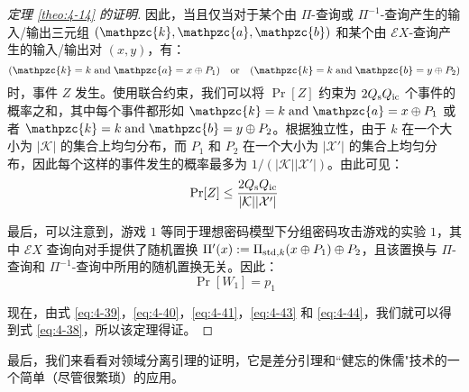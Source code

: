 \begin{proof}[定理 \ref{theo:4-14} 的证明]
因此，当且仅当对于某个由 $\Pi$-查询或 $\Pi^{-1}$-查询产生的输入/输出三元组 $(\mathpzc{k},\mathpzc{a},\mathpzc{b})$ 和某个由 $\mathcal{E}X$-查询产生的输入/输出对 $(x,y)$，有：
\begin{equation}
(\mathpzc{k}=k\;{\rm and}\;\mathpzc{a}=x\oplus P_1)
\quad\text{or}\quad
(\mathpzc{k}=k\;{\rm and}\;\mathpzc{b}=y\oplus P_2)
\end{equation}
时，事件 $Z$ 发生。使用联合约束，我们可以将 $\Pr[Z]$ 约束为 $2Q_{\rm s}Q_{\rm ic}$ 个事件的概率之和，其中每个事件都形如 $\mathpzc{k}=k\;\text{and}\;\mathpzc{a}=x\oplus P_1$ 或者 $\mathpzc{k}=k\;\text{and}\;\mathpzc{b}=y\oplus P_2$。根据独立性，由于 $k$ 在一个大小为 $|\mathcal{K}|$ 的集合上均匀分布，而 $P_1$ 和 $P_2$ 在一个大小为 $|\mathcal{X}'|$ 的集合上均匀分布，因此每个这样的事件发生的概率最多为 ${1}/{(|\mathcal{K}||\mathcal{X}'|)}$。由此可见：
\begin{equation}\label{eq:4-43}
\Pr[Z]\leq\frac{2Q_{\rm s}Q_{\rm ic}}{|\mathcal{K}||\mathcal{X}'|}
\end{equation}

最后，可以注意到，游戏 $1$ 等同于理想密码模型下分组密码攻击游戏的实验 $1$，其中 $\mathcal{E}X$ 查询向对手提供了随机置换 $\Pi'(x):=\Pi_{{\rm std},k}(x\oplus P_1) \oplus P_2$，且该置换与 $\Pi$-查询和 $\Pi^{-1}$-查询中所用的随机置换无关。因此：
\begin{equation}\label{eq:4-44}
\Pr[W_1]=p_1
\end{equation}

现在，由式 \ref{eq:4-39}，\ref{eq:4-40}，\ref{eq:4-41}，\ref{eq:4-43} 和 \ref{eq:4-44}，我们就可以得到式 \ref{eq:4-38}，所以该定理得证。
\end{proof}


最后，我们来看看对领域分离引理的证明，它是差分引理和``健忘的侏儒"技术的一个简单（尽管很繁琐）的应用。

